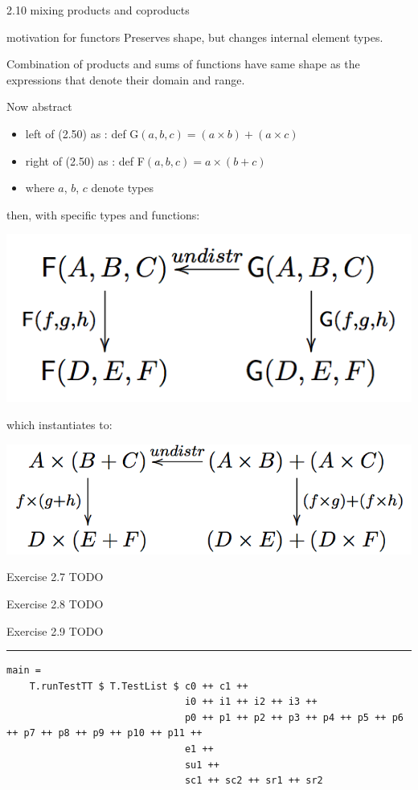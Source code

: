 \documentclass[presentation]{beamer}
\begin{document}
\begin{frame}[fragile,label=sec-9]{2.10 mixing products and coproducts}
\begin{block}{motivation for functors}
Preserves shape, but changes internal element types.

Combination of products and sums of functions have same shape as the
expressions that denote their domain and range.

Now abstract

\begin{itemize}
\item left of (2.50) as : def G$(a,b,c) = (a \times b) + (a \times c)$
\item right of (2.50) as : def F$(a,b,c) = a \times (b + c)$
\item where $a$, $b$, $c$ denote types
\end{itemize}

then, with specific types and functions:

\includegraphics[width=.9\linewidth]{./F-G-undistr.png}

which instantiates to:

\includegraphics[width=.9\linewidth]{./F-G-undistr-instantiated.png}

\alert{Exercise 2.7} TODO

\alert{Exercise 2.8} TODO

\alert{Exercise 2.9} TODO

\rule{\linewidth}{0.5pt}

\begin{verbatim}
main =
    T.runTestTT $ T.TestList $ c0 ++ c1 ++
                               i0 ++ i1 ++ i2 ++ i3 ++
                               p0 ++ p1 ++ p2 ++ p3 ++ p4 ++ p5 ++ p6 ++ p7 ++ p8 ++ p9 ++ p10 ++ p11 ++
                               e1 ++
                               su1 ++
                               sc1 ++ sc2 ++ sr1 ++ sr2
\end{verbatim}
\end{block}
\end{frame}
\end{document}
